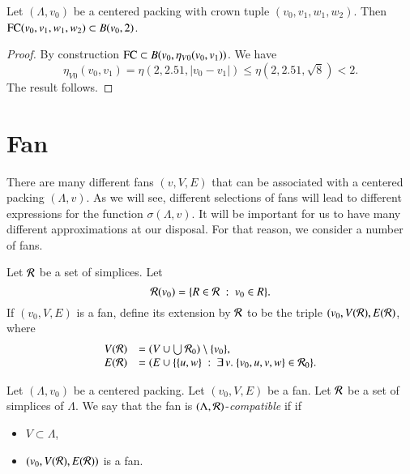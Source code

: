 \begin{lemma}
Let $(\Lambda,v_0)$ be a centered packing with crown tuple $(v_0,v_1,w_1,w_2)$.   Then
${\operatorname{FC}}(v_0,v_1,w_1,w_2)\subset B(v_0,2)$.
\end{lemma}

\begin{proof}
By construction ${\operatorname{FC}}\subset B(v_0,\eta_{V0}(v_0,v_1))$.
We have
   $$\eta_{V0}(v_0,v_1) = \eta(2,2.51,|v_0-v_1|) \le \eta(2,2.51,\sqrt8) < 2.$$
The result follows.
\end{proof}







\section{Fan}

There are many different fans $(v,V,E)$ that
can be associated with a centered packing $(\Lambda,v)$.
As we will see, different selections of fans
will lead to different expressions for the function $\sigma(\Lambda,v)$.
It will be important for us to have many different approximations
at our disposal.  For that reason, we consider a number of
fans.  

\begin{definition}[extension]\label{def:extension}
Let ${\mathcal R}$ be a set of simplices.   Let 
$${\mathcal R}(v_0) = \{R \in{\mathcal R} \ :\  v_0\in R\}.$$
If $(v_0,V,E)$ is a fan, define its extension by ${\mathcal R}$ to be
the triple $(v_0,V({\mathcal R}),E({\mathcal R})$, where
$$
\begin{array}{lll}
V({\mathcal R}) &= (V \cup \bigcup {\mathcal R}_0) \setminus \{v_0\},\\
E({\mathcal R}) &= (E \cup \{\{u,w\} \ :\  \exists\, v.\ \{v_0,u,v,w\}\in {\mathcal R}_0\}.
\end{array}
$$
\end{definition}

\begin{definition}[compatible]\label{def:compatible}
Let $(\Lambda,v_0)$ be a centered packing.
Let $(v_0,V,E)$ be a fan.  Let ${\mathcal R}$ be a set of simplices of $\Lambda$.  
We say that the fan is
$(\Lambda,{\mathcal R})$-{\it compatible} if
if 
\begin{itemize}
\item
 $V\subset \Lambda$, 
\item $(v_0,V({\mathcal R}),E({\mathcal R}))$ is a fan.
\end{itemize}
\end{definition}

